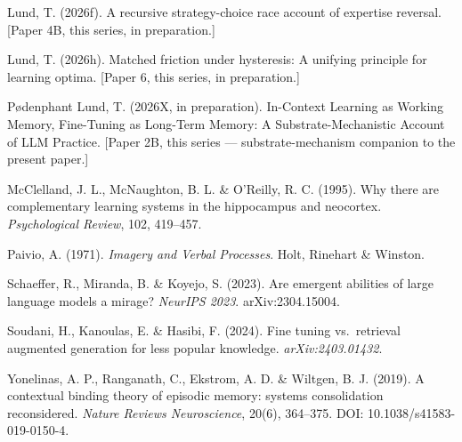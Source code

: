 \documentclass[
]{article}
\begin{document}
Lund, T. (2026f). A recursive strategy-choice race account of expertise
reversal. {[}Paper 4B, this series, in preparation.{]}

Lund, T. (2026h). Matched friction under hysteresis: A unifying
principle for learning optima. {[}Paper 6, this series, in
preparation.{]}

Pødenphant Lund, T. (2026X, in preparation). In-Context Learning as
Working Memory, Fine-Tuning as Long-Term Memory: A Substrate-Mechanistic
Account of LLM Practice. {[}Paper 2B, this series ---
substrate-mechanism companion to the present paper.{]}

McClelland, J. L., McNaughton, B. L. \& O'Reilly, R. C. (1995). Why
there are complementary learning systems in the hippocampus and
neocortex. \emph{Psychological Review}, 102, 419--457.

Paivio, A. (1971). \emph{Imagery and Verbal Processes}. Holt, Rinehart
\& Winston.

Schaeffer, R., Miranda, B. \& Koyejo, S. (2023). Are emergent abilities
of large language models a mirage? \emph{NeurIPS 2023}.
arXiv:2304.15004.

Soudani, H., Kanoulas, E. \& Hasibi, F. (2024). Fine tuning
vs.~retrieval augmented generation for less popular knowledge.
\emph{arXiv:2403.01432}.

Yonelinas, A. P., Ranganath, C., Ekstrom, A. D. \& Wiltgen, B. J.
(2019). A contextual binding theory of episodic memory: systems
consolidation reconsidered. \emph{Nature Reviews Neuroscience}, 20(6),
364--375. DOI: 10.1038/s41583-019-0150-4.
\end{document}

